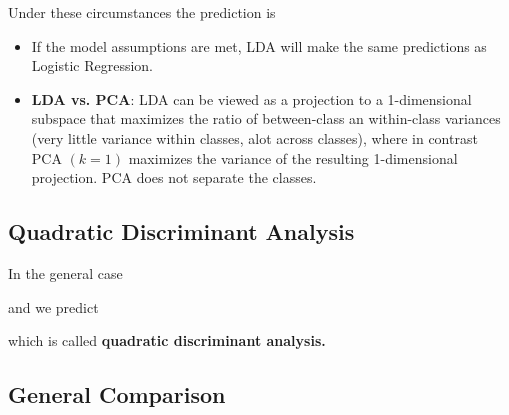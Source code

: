 \documentclass[8pt,a4paper]{scrartcl}
\begin{document}
\begin{multicols*}{3}

Under these circumstances the prediction is


\begin{itemize}
\ncompaq
\item If the model assumptions are met, LDA will make the same predictions as Logistic Regression.
\item \textbf{LDA vs. PCA}: LDA can be viewed as a projection to a 1-dimensional subspace that maximizes the ratio of between-class an within-class variances (very little variance within classes, alot across classes), where in contrast PCA $(k=1)$ maximizes the variance of the resulting 1-dimensional projection. PCA does not separate the classes.
\end{itemize}

\subsection{Quadratic Discriminant Analysis}

In the general case 


and we predict


which is called \textbf{quadratic discriminant analysis.}

\subsection{General Comparison}


\end{multicols*}
\end{document}
